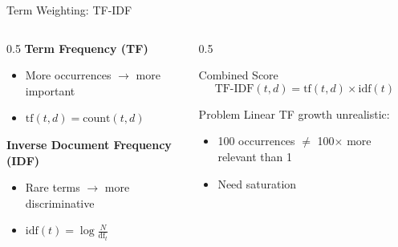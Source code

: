 \documentclass[aspectratio=169]{beamer}
\begin{document}
\begin{frame}{Term Weighting: TF-IDF}
\begin{columns}
\begin{column}{0.5\textwidth}
\textbf{Term Frequency (TF)}
\begin{itemize}
    \item More occurrences $\rightarrow$ more important
    \item $\text{tf}(t,d) = \text{count}(t,d)$
\end{itemize}

\vspace{1em}

\textbf{Inverse Document Frequency (IDF)}
\begin{itemize}
    \item Rare terms $\rightarrow$ more discriminative
    \item $\text{idf}(t) = \log\frac{N}{\text{df}_t}$
\end{itemize}
\end{column}

\begin{column}{0.5\textwidth}
\begin{block}{Combined Score}
$$\text{TF-IDF}(t,d) = \text{tf}(t,d) \times \text{idf}(t)$$
\end{block}

\vspace{1em}

\begin{alertblock}{Problem}
Linear TF growth unrealistic:
\begin{itemize}
    \item 100 occurrences $\neq$ 100$\times$ more relevant than 1
    \item Need saturation
\end{itemize}
\end{alertblock}
\end{column}
\end{columns}
\end{frame}
\end{document}

